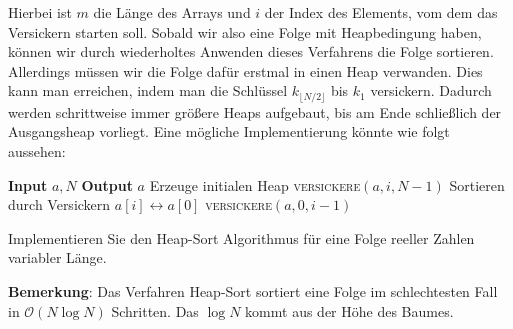 \documentclass[tikz,12pt]{article}
\begin{document}
Hierbei ist $m$ die Länge des Arrays und $i$ der Index des Elements, vom dem das Versickern starten soll.
Sobald wir also eine Folge mit Heapbedingung haben, können wir durch wiederholtes Anwenden dieses Verfahrens die Folge sortieren.
Allerdings müssen wir die Folge dafür erstmal in einen Heap verwanden. 
Dies kann man erreichen, indem man die Schlüssel $k_{\lfloor N/2\rfloor}$ bis $k_1$ versickern. 
Dadurch werden schrittweise immer größere Heaps aufgebaut, bis am Ende schließlich der Ausgangsheap vorliegt. 
Eine mögliche Implementierung könnte wie folgt aussehen:
\begin{algorithmic}[1]
  \State \textbf{Input} $a,N$
  \State \textbf{Output} $a$
  \Comment Erzeuge initialen Heap
  \State \textsc{versickere}$(a, i, N-1)$
  \EndFor
  \Comment Sortieren durch Versickern
  \State $a[i]\leftrightarrow a[0]$
  \State \textsc{versickere}$(a, 0, i-1)$
  \EndFor
  \EndProcedure
\end{algorithmic}
Implementieren Sie den Heap-Sort Algorithmus für eine Folge reeller Zahlen variabler Länge.

\textbf{Bemerkung}: Das Verfahren Heap-Sort sortiert eine Folge im schlechtesten Fall in $\mathcal{O}(N\log N)$ Schritten.
Das $\log N$ kommt aus der Höhe des Baumes.
\end{document}
